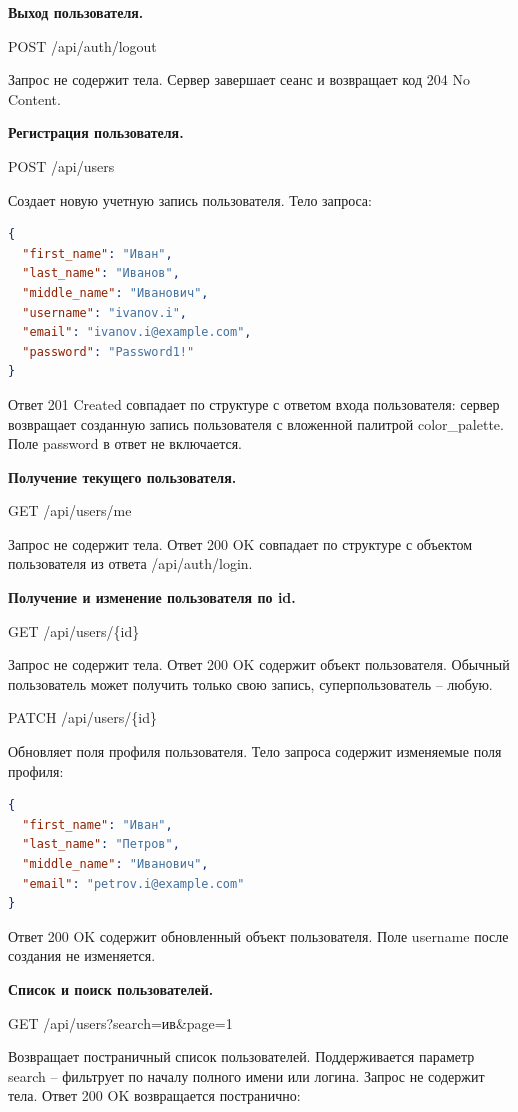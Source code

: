 \textbf{Выход пользователя.}

POST /api/auth/logout

Запрос не содержит тела. Сервер завершает сеанс и возвращает код 204 No Content.

\textbf{Регистрация пользователя.}

POST /api/users

Создает новую учетную запись пользователя. Тело запроса:

\begin{lstlisting}[numbers=none, language=json]
{
  "first_name": "Иван",
  "last_name": "Иванов",
  "middle_name": "Иванович",
  "username": "ivanov.i",
  "email": "ivanov.i@example.com",
  "password": "Password1!"
}
\end{lstlisting}


Ответ 201 Created совпадает по структуре с ответом входа пользователя: сервер возвращает созданную запись пользователя с вложенной палитрой color\_palette. Поле password в ответ не включается.

\textbf{Получение текущего пользователя.}

GET /api/users/me

Запрос не содержит тела. Ответ 200 OK совпадает по структуре с объектом пользователя из ответа /api/auth/login.

\textbf{Получение и изменение пользователя по id.}

GET /api/users/\{id\}

Запрос не содержит тела. Ответ 200 OK содержит объект пользователя. Обычный пользователь может получить только свою запись, суперпользователь -- любую.

PATCH /api/users/\{id\}

Обновляет поля профиля пользователя. Тело запроса содержит изменяемые поля профиля:

\begin{lstlisting}[numbers=none, language=json]
{
  "first_name": "Иван",
  "last_name": "Петров",
  "middle_name": "Иванович",
  "email": "petrov.i@example.com"
}
\end{lstlisting}


Ответ 200 OK содержит обновленный объект пользователя. Поле username после создания не изменяется.

\textbf{Список и поиск пользователей.}

GET /api/users?search=ив\&page=1

Возвращает постраничный список пользователей. Поддерживается параметр search -- фильтрует по началу полного имени или логина. Запрос не содержит тела. Ответ 200 OK возвращается постранично:

